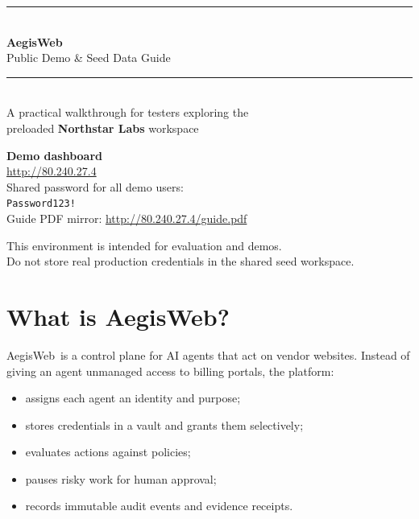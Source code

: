 \documentclass[11pt,a4paper]{article}
\newcommand{\ProductName}{AegisWeb}
\newcommand{\DemoAppUrl}{http://80.240.27.4}
\newcommand{\DemoPassword}{Password123!}
\newcommand{\DemoOrgName}{Northstar Labs}
\begin{document}
\begin{titlepage}
  \centering
  \vspace*{1.2cm}
  {\color{aegisblue}\rule{\textwidth}{1.6pt}}\\[0.6cm]
  {\Huge\bfseries\color{aegisblue} \ProductName}\\[0.35cm]
  {\Large\color{aegisaccent} Public Demo \& Seed Data Guide}\\[0.55cm]
  {\color{aegisblue}\rule{\textwidth}{0.8pt}}\\[1.1cm]

  {\large A practical walkthrough for testers exploring the\\
  preloaded \textbf{\DemoOrgName} workspace}\\[1.4cm]

  \begin{tcolorbox}[
    colback=codebg,
    colframe=softborder,
    width=0.88\textwidth,
    arc=2pt
  ]
    \centering
    \textbf{Demo dashboard}\\[0.25em]
    \url{\DemoAppUrl}\\[0.7em]
    \small Shared password for all demo users:\\
    \texttt{\DemoPassword}\\[0.55em]
    \small Guide PDF mirror: \url{\DemoAppUrl/guide.pdf}
  \end{tcolorbox}

  \vfill
  {\small\color{aegisgray}
    This environment is intended for evaluation and demos.\\
    Do not store real production credentials in the shared seed workspace.
  }
  \vspace{1cm}
\end{titlepage}

\tableofcontents
\newpage
{}

\section{What is \ProductName?}

\ProductName\ is a control plane for AI agents that act on vendor websites.
Instead of giving an agent unmanaged access to billing portals, the platform:

\begin{itemize}[leftmargin=1.2em]
  \item assigns each agent an identity and purpose;
  \item stores credentials in a vault and grants them selectively;
  \item evaluates actions against policies;
  \item pauses risky work for human approval;
  \item records immutable audit events and evidence receipts.
\end{itemize}
\end{document}
